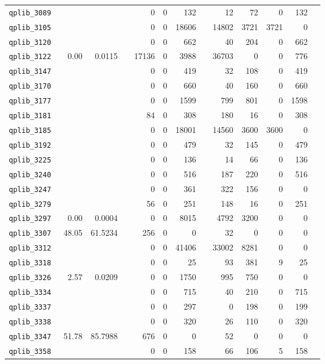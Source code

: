 \begin{longtable}{lrrrrrrrrrrrr}
{\tt 	qplib\_3089	}	&		&		&	&	0	&	0	&	132	&	&	12	&	72	&	0	&	132	\\
{\tt 	qplib\_3105	}	&		&		&	&	0	&	0	&	18606	&	&	14802	&	3721	&	3721	&	0	\\
{\tt 	qplib\_3120	}	&		&		&	&	0	&	0	&	662	&	&	40	&	204	&	0	&	662	\\
{\tt 	qplib\_3122	}	&	0.00	&	0.0115	&	&	17136	&	0	&	3988	&	&	36703	&	0	&	0	&	776	\\
{\tt 	qplib\_3147	}	&		&		&	&	0	&	0	&	419	&	&	32	&	108	&	0	&	419	\\
{\tt 	qplib\_3170	}	&		&		&	&	0	&	0	&	660	&	&	40	&	160	&	0	&	660	\\
{\tt 	qplib\_3177	}	&		&		&	&	0	&	0	&	1599	&	&	799	&	801	&	0	&	1598	\\
{\tt 	qplib\_3181	}	&		&		&	&	84	&	0	&	308	&	&	180	&	16	&	0	&	308	\\
{\tt 	qplib\_3185	}	&		&		&	&	0	&	0	&	18001	&	&	14560	&	3600	&	3600	&	0	\\
{\tt 	qplib\_3192	}	&		&		&	&	0	&	0	&	479	&	&	32	&	145	&	0	&	479	\\
{\tt 	qplib\_3225	}	&		&		&	&	0	&	0	&	136	&	&	14	&	66	&	0	&	136	\\
{\tt 	qplib\_3240	}	&		&		&	&	0	&	0	&	516	&	&	187	&	220	&	0	&	516	\\
{\tt 	qplib\_3247	}	&		&		&	&	0	&	0	&	361	&	&	322	&	156	&	0	&	0	\\
{\tt 	qplib\_3279	}	&		&		&	&	56	&	0	&	251	&	&	148	&	16	&	0	&	251	\\
{\tt 	qplib\_3297	}	&	0.00	&	0.0004	&	&	0	&	0	&	8015	&	&	4792	&	3200	&	0	&	0	\\
{\tt 	qplib\_3307	}	&	48.05	&	61.5234	&	&	256	&	0	&	0	&	&	32	&	0	&	0	&	0	\\
{\tt 	qplib\_3312	}	&		&		&	&	0	&	0	&	41406	&	&	33002	&	8281	&	0	&	0	\\
{\tt 	qplib\_3318	}	&		&		&	&	0	&	0	&	25	&	&	93	&	381	&	9	&	25	\\
{\tt 	qplib\_3326	}	&	2.57	&	0.0209	&	&	0	&	0	&	1750	&	&	995	&	750	&	0	&	0	\\
{\tt 	qplib\_3334	}	&		&		&	&	0	&	0	&	715	&	&	40	&	210	&	0	&	715	\\
{\tt 	qplib\_3337	}	&		&		&	&	0	&	0	&	297	&	&	0	&	198	&	0	&	199	\\
{\tt 	qplib\_3338	}	&		&		&	&	0	&	0	&	320	&	&	26	&	110	&	0	&	320	\\
{\tt 	qplib\_3347	}	&	51.78	&	85.7988	&	&	676	&	0	&	0	&	&	52	&	0	&	0	&	0	\\
{\tt 	qplib\_3358	}	&		&		&	&	0	&	0	&	158	&	&	66	&	106	&	5	&	158	\\

\end{longtable}
